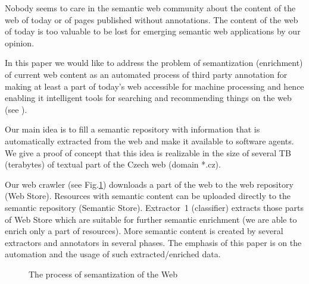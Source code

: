 \documentclass{sig-alternate}
\begin{document}
Nobody seems to care in the semantic web community about the content of the web of today or of pages published without annotations. The content of the web of today is too valuable to be lost for emerging semantic web applications by our opinion. \par

In this paper we would like to address the problem of semantization (enrichment) of current web content as an automated process of third party annotation for making at least a part of today's web accessible for machine processing and hence enabling it intelligent tools for searching and recommending things on the web (see \cite{biblio:LeeWebThings}). \par

Our main idea is to fill a semantic repository with information that is automatically extracted from the web and make it available to software agents. We give a proof of concept that this idea is realizable in the size of several TB (terabytes) of textual part of the Czech web (domain *.cz).\par

Our web crawler (see Fig.\ref{img:Semantization}) downloads a part of the web to the web repository (Web Store). Resources with semantic content can be uploaded directly to the semantic repository (Semantic Store). Extractor~1 (classifier) extracts those parts of Web Store which are suitable for further semantic enrichment (we are able to enrich only a part of resources). More semantic content is created by several extractors and annotators in several phases. The emphasis of this paper is on the automation and the usage of such extracted/enriched data.

\begin{figure}
\centering
{}
\caption{The process of semantization of the Web}
\label{img:Semantization}
\end{figure}


\end{document}
